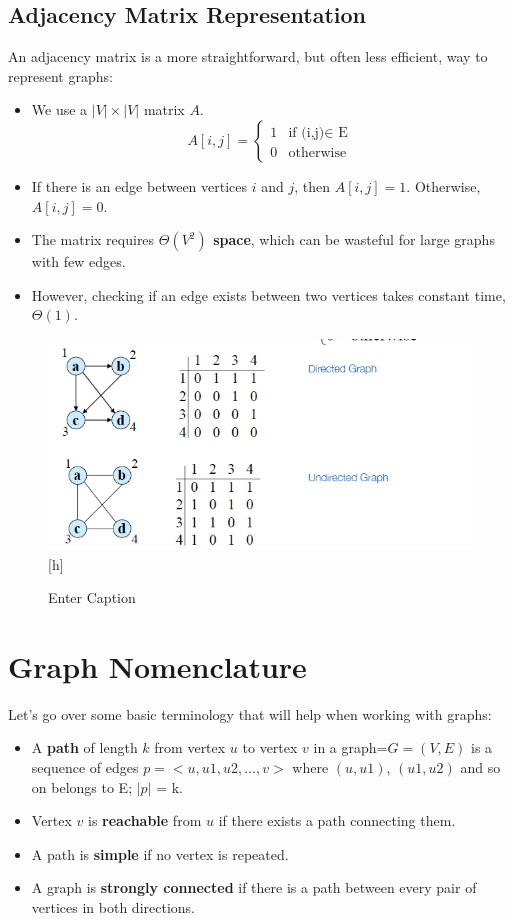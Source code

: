 \subsection{Adjacency Matrix Representation}
An adjacency matrix is a more straightforward, but often less efficient, way to represent graphs:
\begin{itemize}
    \item We use a $|V| \times |V|$ matrix $A$.
        \[
        A[i, j] = 
        \begin{cases}
            1 & \text{if (i,j)$\in$ E} \\
            0 & \text{otherwise } 
        \end{cases}
        \]
    \item If there is an edge between vertices $i$ and $j$, then $A[i, j] = 1$. Otherwise, $A[i, j] = 0$.
    \item The matrix requires \textbf{ $\Theta(V^2)$ space}, which can be wasteful for large graphs with few edges.
    \item However, checking if an edge exists between two vertices takes constant time, $\Theta(1)$.
\end{itemize}
\begin{figure}
    \centering
    \includegraphics[width=0.75\linewidth]{Adjacency matrix.png}[h]
    \caption{Enter Caption}
    \label{fig:enter-label}
\end{figure}

\section{Graph Nomenclature}
Let's go over some basic terminology that will help when working with graphs:
\begin{itemize}
    \item A \textbf{path} of length $k$ from vertex $u$ to vertex $v$ in a graph=$G=(V,E)$ is a sequence of edges $p=<u,u1,u2, … , v> $ where $(u,u1)$, $(u1,u2)$ and
so on belongs to E; $|p|$ = k.
    \item Vertex $v$ is \textbf{reachable} from $u$ if there exists a path connecting them.
    \item A path is \textbf{simple} if no vertex is repeated.
    \item A graph is \textbf{strongly connected} if there is a path between every pair of vertices in both directions.
\end{itemize}
